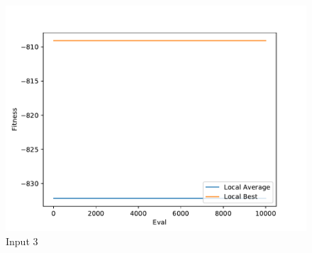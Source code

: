 \documentclass{standalone}
\begin{document}
\begin{figure}[!htb]
	\caption{Input 3}
	\label{fig:graph_3056}
	\includegraphics[width=\textwidth]{../graphs/graphs/3056.pdf}
\end{figure}
\end{document}
